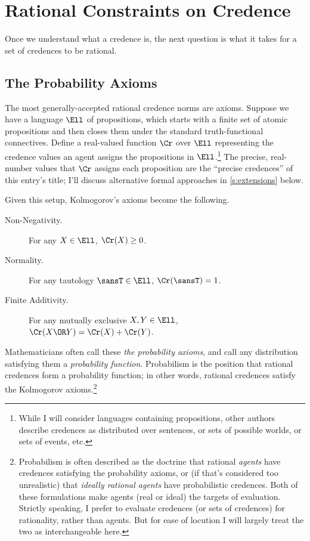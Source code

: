\section{Rational Constraints on Credence}\label{s:constraints}

Once we understand what a credence is, the next question is what it takes for a set of credences to be rational.

\subsection{The Probability Axioms}\label{ss:Kolm}

The most generally-accepted rational credence norms are  axioms. Suppose we have a language $\Ell$ of propositions, which starts with a finite set of atomic propositions and then closes them under the standard truth-functional connectives. Define a real-valued function $\Cr$ over $\Ell$ representing the credence values an agent assigns the propositions in $\Ell$.\footnote
{While I will consider languages containing propositions, other authors describe credences as distributed over sentences, or sets of possible worlds, or sets of events, etc.} 
 The precise, real-number values that $\Cr$ assigns each proposition are the ``precise credences'' of this entry's title; I'll discuss alternative formal approaches in \autoref{s:extensions}  below.

Given this setup, Kolmogorov's axioms become the following.
\begin{description}
\item[Non-Negativity.\,] {For any $X \in \Ell$, $\Cr(X) \ge 0$.}
\item[Normality.\,] {For any tautology $\sansT \in \Ell$, $\Cr(\sansT)=1$.}
\item[Finite Additivity.\,] {For any mutually exclusive $X, Y \in \Ell$,\\ $\Cr(X \OR Y)=\Cr(X)+\Cr(Y)$.}  
\end{description}  
Mathematicians often call these \textit{the probability axioms}, and call any distribution satisfying them a \textit{probability function}. Probabilism is the position that rational credences form a probability function; in other words, rational credences satisfy the Kolmogorov axioms.\footnote
{Probabilism is often described as the doctrine that rational \emph{agents} have credences satisfying the probability axioms, or (if that's considered too unrealistic) that \emph{ideally rational agents} have probabilistic credences. Both of these formulations make agents (real or ideal) the targets of evaluation. Strictly speaking, I prefer to evaluate credences (or sets of credences) for rationality, rather than agents. But for ease of locution I will largely treat the two as interchangeable here.} 

